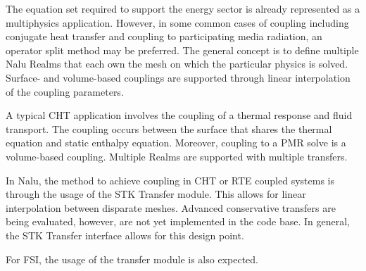The equation set required to support the energy sector
is already represented as a multiphysics application. However,
in some common cases of coupling including conjugate heat transfer 
and coupling to participating media radiation, an operator split method
may be preferred. The general concept is to define multiple Nalu Realms
that each own the mesh on which the particular physics is solved. Surface- and
volume-based couplings are supported through linear interpolation of the coupling
parameters.

A typical CHT application involves the coupling of a thermal response and
fluid transport. The coupling occurs between the surface that shares
the thermal equation and static enthalpy equation. Moreover, coupling to a
PMR solve is a volume-based coupling. Multiple Realms are supported with multiple
transfers.

In Nalu, the method to achieve coupling in CHT or RTE coupled systems is through
the usage of the STK Transfer module. This allows for linear interpolation between 
disparate meshes. Advanced conservative transfers are being evaluated, however, are
not yet implemented in the code base. In general, the STK Transfer interface
allows for this design point.

For FSI, the usage of the transfer module is also expected.
